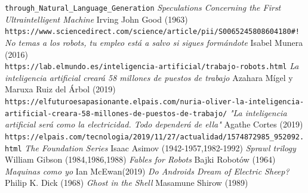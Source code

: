 \documentclass[12pt,a4paper]{article}
\begin{document}
\begin{thebibliography}{9}
\texttt{through\_Natural\_Language\_Generation}
 \textit{Speculations Concerning the First Ultraintelligent Machine} Irving John Good (1963)
\\\texttt{https://www.sciencedirect.com/science/article/pii/S0065245808604180\#!}
 \textit{No temas a los robots, tu empleo está a salvo si sigues formándote} Isabel Munera (2016)
\\\texttt{https://lab.elmundo.es/inteligencia-artificial/trabajo-robots.html}
 \textit{La inteligencia artificial creará 58 millones de puestos de trabajo} Azahara Mígel y Maruxa Ruiz del Árbol (2019)
\\\texttt{https://elfuturoesapasionante.elpais.com/nuria-oliver-la-inteligencia-}
\\\texttt{artificial-creara-58-millones-de-puestos-de-trabajo/}
 \textit{"La inteligencia artificial será como la electricidad. Todo dependerá de ella"} Agathe Cortes (2019)
\\\texttt{https://elpais.com/tecnologia/2019/11/27/actualidad/1574872985\_952092.html}
 \textit{The Foundation Series} Isaac Asimov (1942-1957,1982-1992)
 \textit{Sprawl trilogy} William Gibson (1984,1986,1988)
 \textit{Fables for Robots} Bajki Robotów (1964)
 \textit{Maquinas como yo} Ian McEwan(2019)
 \textit{Do Androids Dream of Electric Sheep?} Philip K. Dick (1968)
 \textit{Ghost in the Shell} Masamune Shirow (1989)
\end{thebibliography}
\end{document}
